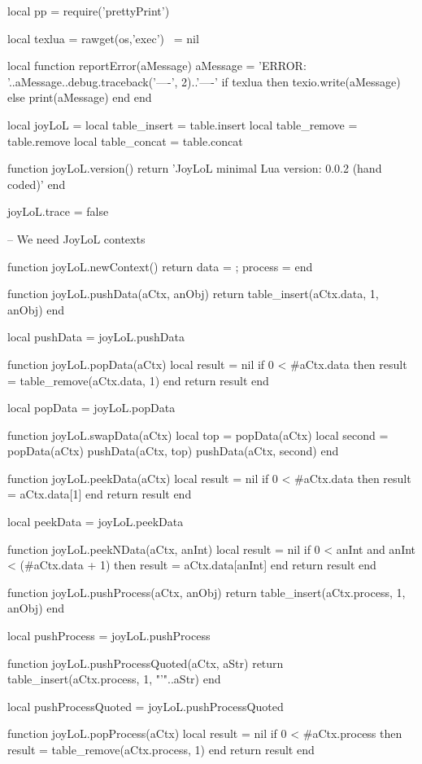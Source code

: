 local pp = require('prettyPrint')

local texlua = rawget(os,'exec')    ~= nil

local function reportError(aMessage)
  aMessage = 'ERROR: '..aMessage..debug.traceback('\n----', 2)..'\n----\n'
  if texlua then
    texio.write(aMessage)
  else
    print(aMessage)
  end
end

local joyLoL = { }
local table_insert = table.insert
local table_remove = table.remove
local table_concat = table.concat

function joyLoL.version()
  return 'JoyLoL minimal Lua version: 0.0.2 (hand coded)'
end

joyLoL.trace = false

-- We need JoyLoL contexts

function joyLoL.newContext()
  return { data = { }; process = { } }
end

function joyLoL.pushData(aCtx, anObj)
  return table_insert(aCtx.data, 1, anObj)
end

local pushData = joyLoL.pushData

function joyLoL.popData(aCtx)
  local result = nil
  if 0 < #aCtx.data then
    result = table_remove(aCtx.data, 1)
  end
  return result
end

local popData = joyLoL.popData

function joyLoL.swapData(aCtx)
  local top    = popData(aCtx)
  local second = popData(aCtx)
  pushData(aCtx, top)
  pushData(aCtx, second)
end

function joyLoL.peekData(aCtx)
  local result = nil
  if 0 < #aCtx.data then
    result = aCtx.data[1]
  end
  return result
end

local peekData = joyLoL.peekData

function joyLoL.peekNData(aCtx, anInt)
  local result = nil
  if 0 < anInt and anInt < (#aCtx.data + 1) then
    result = aCtx.data[anInt]
  end
  return result
end

function joyLoL.pushProcess(aCtx, anObj)
  return table_insert(aCtx.process, 1, anObj)
end

local pushProcess = joyLoL.pushProcess

function joyLoL.pushProcessQuoted(aCtx, aStr)
  return table_insert(aCtx.process, 1, "'"..aStr)
end

local pushProcessQuoted = joyLoL.pushProcessQuoted

function joyLoL.popProcess(aCtx)
  local result = nil
  if 0 < #aCtx.process then
    result = table_remove(aCtx.process, 1)
  end
  return result
end

